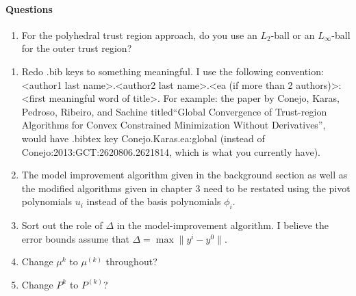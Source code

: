 \documentclass[11pt,letterpaper]{thesis2}
\begin{document}
\paragraph{Questions}
\begin{enumerate}
\item For the polyhedral trust region approach, do you use an $L_2$-ball or an $L_{\infty}$-ball for the outer trust region?
\end{enumerate}

\begin{enumerate}
\item Redo .bib keys to something meaningful.   I use the following convention:   <author1 last name>.<author2 last name>.<ea (if more than 2 authors)>:<first meaningful word of title>.  For example:
the paper by   Conejo, Karas, Pedroso, Ribeiro, and Sachine titled``Global Convergence of Trust-region Algorithms for Convex Constrained Minimization Without Derivatives'', would have .bibtex key
Conejo.Karas.ea:global  (instead of Conejo:2013:GCT:2620806.2621814, which is what you currently have).

\item The model improvement algorithm given in the background section as well as the modified algorithms given in chapter 3 need to be restated using the pivot polynomials $u_i$ instead of the basis polynomials $\phi_i$.

\item Sort out the role of $\Delta$ in the model-improvement algorithm.  I believe the error bounds assume that $\Delta = \max \|y^i-y^0\|$.

\item Change $\mu^k$ to $\mu^{(k)}$ throughout?
\item Change $P^k$ to $P^{(k)}$?
\end{enumerate}
\end{document}

